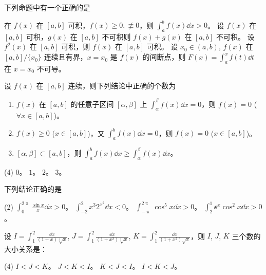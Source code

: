 \begin{ti}
	下列命题中有一个正确的是
	\begin{tasks}
		\task 在 $f(x)$ 在 $[a,b]$ 可积，$f(x) \geq 0, \not\equiv 0$，则 $\int_a^b f(x) \dd{x} > 0$。
		\task 设 $f(x)$ 在 $[a,b]$ 可积，$g(x)$ 在 $[a,b]$ 不可积则 $f(x) + g(x)$ 在 $[a,b]$ 不可积。
		\task 设 $f^2(x)$ 在 $[a,b]$ 可积，则 $f(x)$ 在 $[a,b]$ 可积。
		\task 设 $x_0 \in (a,b)$, $f(x)$ 在 $[a,b]/\{x_0\}$ 连续且有界，$x=x_0$ 是 $f(x)$ 的间断点，则 $F(x) = \int_a^x f(t) \dd{t}$ 在 $x=x_0$ 不可导。
	\end{tasks}
\end{ti}

\begin{ti}
	设 $f(x)$ 在 $[a,b]$ 连续，则下列结论中正确的个数为
	\begin{enumerate}
		\item $f(x)$ 在 $[a,b]$ 的任意子区间 $[\alpha,\beta]$ 上 $\int_\alpha^\beta f(x) \dd{x} = 0$，则 $f(x) = 0$ ($\forall x \in [a,b]$)。
		\item $f(x) \geq 0$ ($x \in [a,b]$)，又 $\int_a^b f(x) \dd{x} = 0$，则 $f(x) = 0$ ($x \in [a,b]$)。
		\item $[\alpha,\beta] \subset [a,b]$，则 $\int_a^b f(x) \dd{x} \geq \int_\alpha^\beta f(x) \dd{x}$。
	\end{enumerate}
	\begin{tasks}(4)
		\task $0$。
		\task $1$。
		\task $2$。
		\task $3$。
	\end{tasks}
\end{ti}

\begin{ti}
	下列结论正确的是
	\begin{tasks}(2)
		\task $\int_0^{2\uppi} \frac{\sin x}{x} \dd{x} > 0$。
		\task $\int_{-2}^2 x^3 2^{x^2} \dd{x} < 0$。
		\task $\int_{-\uppi}^{2\uppi} \cos^5x \dd{x} > 0$。
		\task $\int_2^1 \ee^x \cos^2x \dd{x} > 0$。
	\end{tasks}
\end{ti}

\begin{ti}
	设 $I = \int_1^2 \frac{\dd{x}}{(1+x) \sqrt[3]{x}}$, $J = \int_1^2 \frac{\dd{x}}{(1+x^2) \sqrt[3]{x}}$, $K = \int_1^2 \frac{\dd{x}}{(1+x^2) \sqrt{x}}$，则 $I$, $J$, $K$ 三个数的大小关系是：
	\begin{tasks}(4)
		\task $I < J < K$。
		\task $J < K < I$。
		\task $K < J < I$。
		\task $I < K < J$。
	\end{tasks}
\end{ti}

